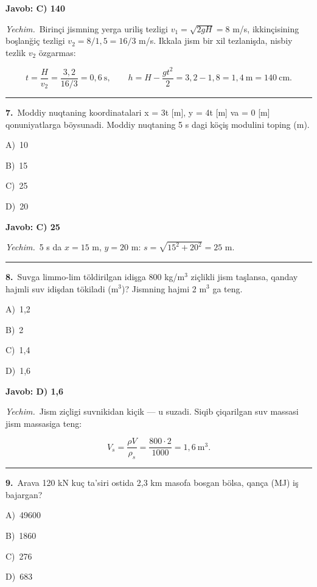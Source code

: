 \documentclass[11pt,a4paper]{article}
\newcommand{\opt}[2]{\hspace*{4mm}#1)\ #2\par}
\begin{document}
\noindent\colorbox{gray!12}{\parbox{\dimexpr\linewidth-2\fboxsep}{\textbf{Javob: C) 140}}}\par\smallskip
\noindent\textit{Yechim.}\ Birinçi jismning yerga uriliş tezligi $v_1=\sqrt{2gH}=8$ m/s, ikkinçisining boşlanğiç tezligi $v_2=8/1{,}5=16/3$ m/s. Ikkala jism bir xil tezlanişda, nisbiy tezlik $v_2$ özgarmas:\par
\[t=\frac{H}{v_2}=\frac{3{,}2}{16/3}=0{,}6\ \text{s},\qquad h=H-\frac{gt^2}{2}=3{,}2-1{,}8=1{,}4\ \text{m}=140\ \text{cm}.\]\par\medskip\hrule\medskip
{}\noindent\begin{minipage}{\linewidth}
\textbf{7.}\ Moddiy nuqtaning koordinatalari x = 3t [m], y = 4t [m] va = 0 [m] qonuniyatlarga böysunadi. Moddiy nuqtaning 5 s dagi köçiş modulini toping (m).\par\smallskip
\opt{A}{10}
\opt{B}{15}
\opt{C}{25}
\opt{D}{20}
\end{minipage}\vspace{2pt}\par
\noindent\colorbox{gray!12}{\parbox{\dimexpr\linewidth-2\fboxsep}{\textbf{Javob: C) 25}}}\par\smallskip
\noindent\textit{Yechim.}\ 5 s da $x=15$ m, $y=20$ m: $s=\sqrt{15^2+20^2}=25$ m.\par\par\medskip\hrule\medskip
{}\noindent\begin{minipage}{\linewidth}
\textbf{8.}\ Suvga limmo-lim töldirilgan idişga 800 kg/m$^{3}$ ziçlikli jism taşlansa, qanday hajmli suv idişdan tökiladi (m$^{3}$)? Jismning hajmi 2 m$^{3}$ ga teng.\par\smallskip
\opt{A}{1,2}
\opt{B}{2}
\opt{C}{1,4}
\opt{D}{1,6}
\end{minipage}\vspace{2pt}\par
\noindent\colorbox{gray!12}{\parbox{\dimexpr\linewidth-2\fboxsep}{\textbf{Javob: D) 1,6}}}\par\smallskip
\noindent\textit{Yechim.}\ Jism ziçligi suvnikidan kiçik — u suzadi. Siqib çiqarilgan suv massasi jism massasiga teng:\par
\[V_s=\frac{\rho V}{\rho_s}=\frac{800\cdot2}{1000}=1{,}6\ \text{m}^3.\]\par\medskip\hrule\medskip
{}\noindent\begin{minipage}{\linewidth}
\textbf{9.}\ Arava 120 kN kuç ta’siri ostida 2,3 km masofa bosgan bölsa, qança (MJ) iş bajargan?\par\smallskip
\opt{A}{49600}
\opt{B}{1860}
\opt{C}{276}
\opt{D}{683}
\end{minipage}\vspace{2pt}\par
\end{document}
